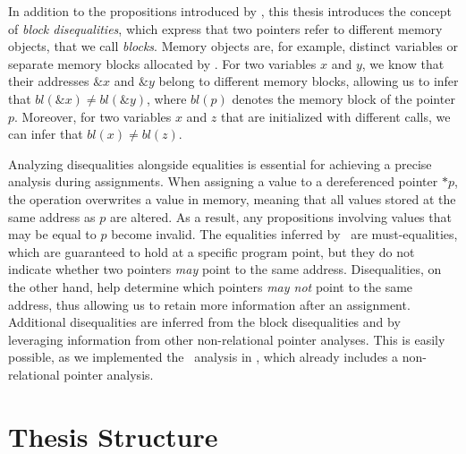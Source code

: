 In addition to the propositions introduced by \textcite{2pointer}, this thesis introduces the concept of \emph{block disequalities},
which express that two pointers refer to different memory objects, that we call \emph{blocks}.
Memory objects are, for example, distinct variables or separate memory blocks allocated by \malloc.
For two variables $x$ and $y$, we know that their addresses $\&x$ and $\&y$ belong to different memory blocks,
allowing us to infer that $bl(\&x) \neq bl(\&y)$, where $bl(p)$ denotes the memory block of the pointer $p$.
Moreover, for two variables $x$ and $z$ that are initialized with different \malloc calls,
we can infer that $bl(x) \neq bl(z)$.

Analyzing disequalities alongside equalities is essential for achieving a precise analysis during assignments.
When assigning a value to a dereferenced pointer $*p$,
the operation overwrites a value in memory, meaning that all values stored at the same address as
$p$ are altered.
As a result, any propositions involving values that may be equal to $p$ become invalid.
The equalities inferred by \cpo\ are must-equalities, which are guaranteed to hold at a specific program point, but they do not indicate whether two pointers \emph{may} point to the same address.
Disequalities, on the other hand, help determine which pointers \emph{may not} point to the same address,
thus allowing us to retain more information after an assignment.
Additional disequalities are inferred from the block disequalities and by
leveraging information from other non-relational pointer analyses.
This is easily possible, as we implemented the \cpo\ analysis in \goblint, which already includes a non-relational pointer analysis.

\section{Thesis Structure}

